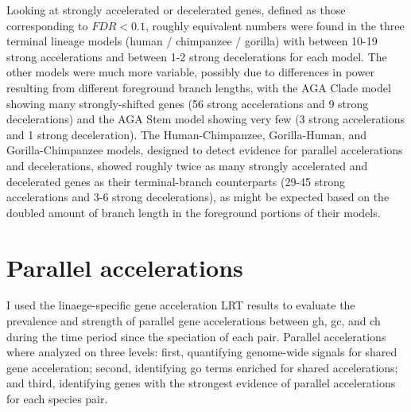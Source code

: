 Looking at strongly accelerated or decelerated genes, defined as those
corresponding to $FDR<0.1$, roughly equivalent numbers were found in
the three terminal lineage models (human / chimpanzee / gorilla) with
between 10-19 strong accelerations and between 1-2 strong
decelerations for each model. The other models were much more
variable, possibly due to differences in power resulting from
different foreground branch lengths, with the AGA Clade model showing
many strongly-shifted genes (56 strong accelerations and 9 strong
decelerations) and the AGA Stem model showing very few (3 strong
accelerations and 1 strong deceleration). The Human-Chimpanzee,
Gorilla-Human, and Gorilla-Chimpanzee models, designed to detect
evidence for parallel accelerations and decelerations, showed roughly
twice as many strongly accelerated and decelerated genes as their
terminal-branch counterparts (29-45 strong accelerations and 3-6
strong decelerations), as might be expected based on the doubled
amount of branch length in the foreground portions of their models.

\section{Parallel accelerations}
\label{sec_parallel_accel}

I used the linaege-specific gene acceleration LRT results to evaluate
the prevalence and strength of parallel gene accelerations between
\ac{gh}, \ac{gc}, and \ac{ch} during the time period since the
speciation of each pair. Parallel accelerations where analyzed on
three levels: first, quantifying genome-wide signals for shared gene
acceleration; second, identifying \ac{go} terms enriched for shared
accelerations; and third, identifying genes with the strongest
evidence of parallel accelerations for each species pair.

